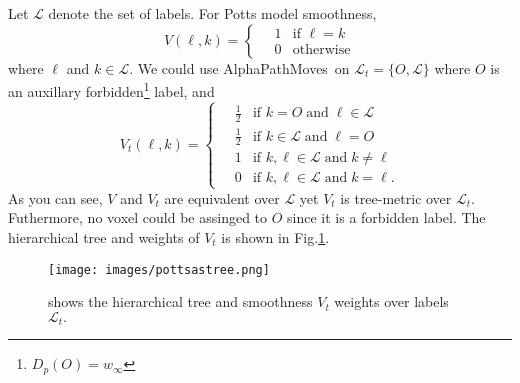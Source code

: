 \documentclass[12pt,letterpaper]{article}
\def\APM{{\ttfamily AlphaPathMoves}~}
\def\labelset{\mathcal{L}}
\def\unary{D}
\begin{document}
Let $\labelset$ denote the set of labels. For Potts model smoothness,
\begin{equation*}
    V(\ell,k)=
  \begin{cases}
    \quad 1 & \mbox{if } \ell=k\\
    \quad 0 & \mbox{otherwise}
  \end{cases}
\end{equation*}
where $\ell$ and $k \in \labelset.$ We could use \APM on $\labelset_t=\{O,\labelset\}$ where $O$ is an auxillary forbidden\footnote{$\unary_p(O)=w_\infty$} label, and
\begin{equation*}
    V_t(\ell,k)=
  \begin{cases}
    \quad \frac{1}{2} & \mbox{if } k = O  \; \text{and} \; \ell \in \labelset\\
    \quad \frac{1}{2} & \mbox{if } k \in \labelset  \; \text{and} \; \ell = O\\
    \quad 1 & \mbox{if } k, \ell \in \labelset \; \text{and} \; k \not=\ell\\
    \quad 0 & \mbox{if } k, \ell \in \labelset \; \text{and} \; k = \ell.
  \end{cases}
\end{equation*}
As you can see, $V$ and $V_t$ are equivalent over $\labelset$  yet $V_t$ is tree-metric over $\labelset_t$. Futhermore, no voxel could be assinged to $O$ since it is a forbidden label.
The hierarchical tree and weights of $V_t$ is shown in Fig.\ref{fg:potts2tree}.
\begin{figure}
\centering
\texttt{[image: images/pottsastree.png]}
\caption{shows the hierarchical tree and smoothness $V_t$ weights over labels $\labelset_t.$}
\label{fg:potts2tree}
\end{figure}


\end{document}
